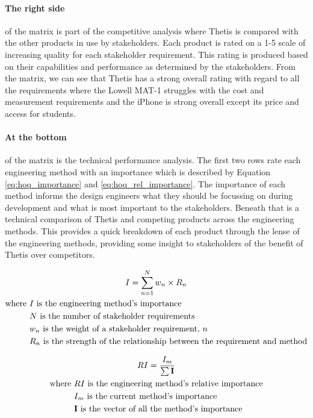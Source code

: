 \paragraph*{The right side} of the matrix is part of the competitive analysis where Thetis is compared with the other products in use by stakeholders.
Each product is rated on a 1-5 scale of increasing quality for each stakeholder requirement.
This rating is produced based on their capabilities and performance as determined by the stakeholders.
From the matrix, we can see that Thetis has a strong overall rating with regard to all the requirements where the Lowell MAT-1 struggles with the cost and measurement requirements and the iPhone is strong overall except its price and access for students.

\paragraph*{At the bottom} of the matrix is the technical performance analysis.
The first two rows rate each engineering method with an importance which is described by Equation \ref{eq:hoq_importance} and \ref{eq:hoq_rel_importance}.
The importance of each method informs the design engineers what they should be focussing on during development and what is most important to the stakeholders.
Beneath that is a technical comparison of Thetis and competing products across the engineering methods.
This provides a quick breakdown of each product through the lense of the engineering methods, providing some insight to stakeholders of the benefit of Thetis over competitors.

\begin{gather}
	\label{eq:hoq_importance}
	I = \sum_{n=1}^N{w_n \times R_n} \\
	\begin{aligned}
		\text{where } &I \text{ is the engineering method's importance} \\
					  &N \text{ is the number of stakeholder requirements} \\
					  &w_n \text{ is the weight of a stakeholder requirement, } n \\
					  &R_n \text{ is the strength of the relationship between the requirement and method}
	\end{aligned} \notag
\end{gather}

\begin{gather}
	\label{eq:hoq_rel_importance}
	RI = \frac{I_m}{\sum{\textbf{I}}} \\
	\begin{aligned}
		\text{where } &RI \text{ is the engineering method's relative importance} \\
					  &I_m \text{ is the current method's importance} \\
					  &\textbf{I} \text{ is the vector of all the method's importance} \\
	\end{aligned} \notag
\end{gather}

